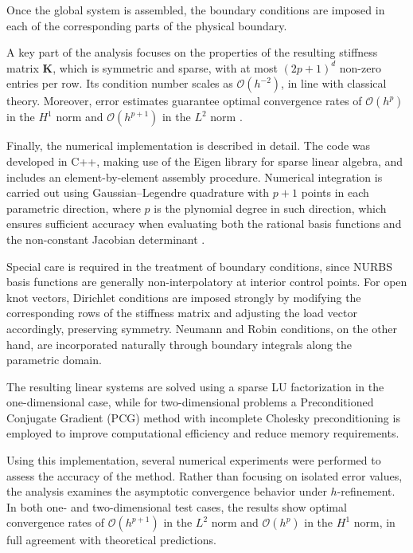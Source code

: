 \documentclass[11pt]{book}
\theoremstyle{plain} %
\theoremstyle{definition} %
\theoremstyle{definition} %
\begin{document}
Once the global system is assembled, the boundary conditions are imposed in each of the corresponding parts of the physical boundary.

A key part of the analysis focuses on the properties of the resulting stiffness matrix $\mathbf{K}$, which is symmetric and sparse, with at most $(2p+1)^d$ non-zero entries per row. Its condition number scales as $\mathcal{O}(h^{-2})$, in line with classical theory. Moreover, error estimates guarantee optimal convergence rates of $\mathcal{O}(h^p)$ in the $H^1$ norm and $\mathcal{O}(h^{p+1})$ in the $L^2$ norm \cite{bazilevs_isogeometric_2010, veiga_estimates_2009}.

Finally, the numerical implementation is described in detail. The code was developed in C++, making use of the Eigen library for sparse linear algebra, and includes an element-by-element assembly procedure. Numerical integration is carried out using Gaussian--Legendre quadrature with $p+1$ points in each parametric direction, where $p$ is the plynomial degree in such direction, which ensures sufficient accuracy when evaluating both the rational basis functions and the non-constant Jacobian determinant \cite{antolin_efficient_2015}.

Special care is required in the treatment of boundary conditions, since NURBS basis functions are generally non-interpolatory at interior control points. For open knot vectors, Dirichlet conditions are imposed strongly by modifying the corresponding rows of the stiffness matrix and adjusting the load vector accordingly, preserving symmetry. Neumann and Robin conditions, on the other hand, are incorporated naturally through boundary integrals along the parametric domain.

The resulting linear systems are solved using a sparse LU factorization in the one-dimensional case, while for two-dimensional problems a Preconditioned Conjugate Gradient (PCG) method with incomplete Cholesky preconditioning is employed to improve computational efficiency and reduce memory requirements.

Using this implementation, several numerical experiments were performed to assess the accuracy of the method. Rather than focusing on isolated error values, the analysis examines the asymptotic convergence behavior under $h$-refinement. In both one- and two-dimensional test cases, the results show optimal convergence rates of $\mathcal{O}(h^{p+1})$ in the $L^2$ norm and $\mathcal{O}(h^p)$ in the $H^1$ norm, in full agreement with theoretical predictions.
\end{document}
